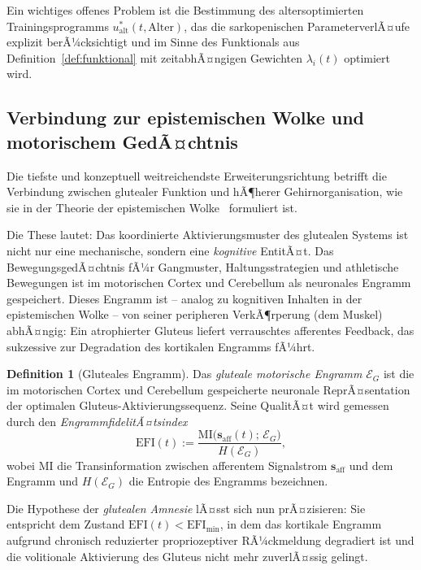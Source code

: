 ﻿\documentclass[12pt,a4paper]{report}
\theoremstyle{plain}
\theoremstyle{definition}
\newtheorem{definition}[theorem]{Definition}
\theoremstyle{remark}
\begin{document}
	Ein wichtiges offenes Problem ist die Bestimmung des altersoptimierten
	Trainingsprogramms $u^*_{\mathrm{alt}}(t, \mathrm{Alter})$, das die
	sarkopenischen ParameterverlÃ¤ufe explizit berÃ¼cksichtigt und im Sinne
	des Funktionals aus Definition~\ref{def:funktional} mit
	zeitabhÃ¤ngigen Gewichten $\lambda_i(t)$ optimiert wird.
	
	\subsection{Verbindung zur epistemischen Wolke und motorischem GedÃ¤chtnis}
	\label{subsec:wolke}
	
	Die tiefste und konzeptuell weitreichendste Erweiterungsrichtung betrifft
	die Verbindung zwischen glutealer Funktion und hÃ¶herer Gehirnorganisation,
	wie sie in der Theorie der epistemischen Wolke~\cite{epp2026wolke} formuliert ist.
	
	Die These lautet: Das koordinierte Aktivierungsmuster des glutealen Systems
	ist nicht nur eine mechanische, sondern eine \emph{kognitive} EntitÃ¤t.
	Das BewegungsgedÃ¤chtnis fÃ¼r Gangmuster, Haltungsstrategien und
	athletische Bewegungen ist im motorischen Cortex und Cerebellum als
	neuronales Engramm gespeichert. Dieses Engramm ist -- analog zu
	kognitiven Inhalten in der epistemischen Wolke -- von seiner
	peripheren VerkÃ¶rperung (dem Muskel) abhÃ¤ngig: Ein atrophierter Gluteus
	liefert verrauschtes afferentes Feedback, das sukzessive zur Degradation
	des kortikalen Engramms fÃ¼hrt.
	
	\begin{definition}[Gluteales Engramm]
		\label{def:engramm}
		Das \emph{gluteale motorische Engramm} $\mathcal{E}_G$ ist die im
		motorischen Cortex und Cerebellum gespeicherte neuronale ReprÃ¤sentation
		der optimalen Gluteus-Aktivierungssequenz. Seine QualitÃ¤t wird gemessen durch
		den \emph{EngrammfidelitÃ¤tsindex}
		\[
		\mathrm{EFI}(t) := \frac{\mathrm{MI}\bigl(\mathbf{s}_{\mathrm{aff}}(t);\,
			\mathcal{E}_G\bigr)}{H(\mathcal{E}_G)},
		\]
		wobei $\mathrm{MI}$ die Transinformation zwischen afferentem Signalstrom
		$\mathbf{s}_{\mathrm{aff}}$ und dem Engramm und $H(\mathcal{E}_G)$
		die Entropie des Engramms bezeichnen.
	\end{definition}
	
	Die Hypothese der \emph{glutealen Amnesie} lÃ¤sst sich nun prÃ¤zisieren:
	Sie entspricht dem Zustand $\mathrm{EFI}(t) < \mathrm{EFI}_{\min}$,
	in dem das kortikale Engramm aufgrund chronisch reduzierter
	propriozeptiver RÃ¼ckmeldung degradiert ist und die volitionale
	Aktivierung des Gluteus nicht mehr zuverlÃ¤ssig gelingt.
	
\end{document}
